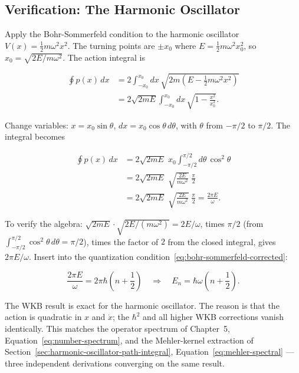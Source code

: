 \subsection{Verification: The Harmonic Oscillator}

Apply the Bohr-Sommerfeld condition to the harmonic oscillator $V(x) = \frac{1}{2}m\omega^2 x^2$. The turning points are $\pm x_0$ where $E = \frac{1}{2}m\omega^2 x_0^2$, so $x_0 = \sqrt{2E/m\omega^2}$. The action integral is
\begin{linenomath}
\begin{equation}
\begin{aligned}
\oint p(x)\,dx &= 2\int_{-x_0}^{x_0} dx\,\sqrt{2m\left(E - \frac{1}{2}m\omega^2 x^2\right)}\\[4pt]
&= 2\sqrt{2mE}\int_{-x_0}^{x_0} dx\,\sqrt{1 - \frac{x^2}{x_0^2}}.
\end{aligned}
\end{equation}
\end{linenomath}
Change variables: $x = x_0\sin\theta$, $dx = x_0\cos\theta\,d\theta$, with $\theta$ from $-\pi/2$ to $\pi/2$. The integral becomes
\begin{linenomath}
\begin{equation}
\begin{aligned}
\oint p(x)\,dx &= 2\sqrt{2mE}\;x_0\int_{-\pi/2}^{\pi/2} d\theta\,\cos^2\theta \\[4pt]
&= 2\sqrt{2mE}\;\sqrt{\frac{2E}{m\omega^2}}\;\frac{\pi}{2} \\[4pt]
&= 2\sqrt{2mE}\;\sqrt{\frac{2E}{m\omega^2}}\;\frac{\pi}{2}
 = \frac{2\pi E}{\omega}.
\end{aligned}
\end{equation}
\end{linenomath}
To verify the algebra: $\sqrt{2mE} \cdot \sqrt{2E/(m\omega^2)} = 2E/\omega$, times $\pi/2$ (from $\int_{-\pi/2}^{\pi/2}\cos^2\theta\,d\theta = \pi/2$), times the factor of $2$ from the closed integral, gives $2\pi E/\omega$. Insert into the quantization condition~\eqref{eq:bohr-sommerfeld-corrected}:
\begin{linenomath}
\begin{equation}
\frac{2\pi E}{\omega} = 2\pi\hbar\left(n + \frac{1}{2}\right) \quad\Longrightarrow\quad E_n = \hbar\omega\left(n + \frac{1}{2}\right).
\label{eq:wkb-harmonic-oscillator}
\end{equation}
\end{linenomath}
The WKB result is exact for the harmonic oscillator. The reason is that the action is quadratic in $x$ and $\dot{x}$; the $\hbar^2$ and all higher WKB corrections vanish identically. This matches the operator spectrum of Chapter~5, Equation~\eqref{eq:number-spectrum}, and the Mehler-kernel extraction of Section~\ref{sec:harmonic-oscillator-path-integral}, Equation~\eqref{eq:mehler-spectral} --- three independent derivations converging on the same result.

